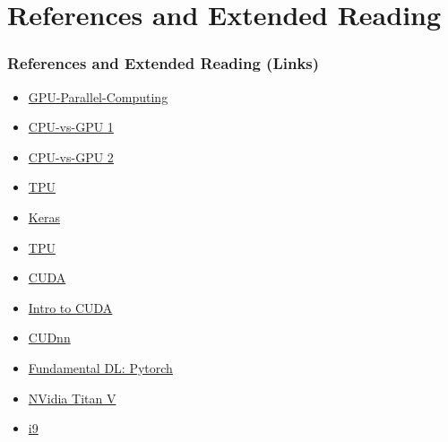 \documentclass[11pt]{beamer}
\begin{document}
\section{References and Extended Reading}
\begin{frame}[fragile]
	\frametitle{References and Extended Reading (Links)}
	
	\begin{itemize}
\item \href{https://openmetal.io/docs/product-guides/private-cloud/gpu-parallel-computing/#GPU-Parallel-Computing}{GPU-Parallel-Computing}
\item \href{https://www.run.ai/guides/multi-gpu/cpu-vs-gpu#hpc}{CPU-vs-GPU 1}
\item \href{https://linuxhint.com/cpu-vs-gpu/#:~:text=While%20a%20CPU%20is%20the,ignited%20a%20worldwide%20AI%20boom.}{CPU-vs-GPU 2}
\item \href{https://cloud.google.com/tpu/docs/tpus}{TPU}
\item \href{https://codelabs.developers.google.com/codelabs/keras-flowers-data/#2}{Keras}
\item \href{https://cloud.google.com/blog/products/ai-machine-learning/an-in-depth-look-at-googles-first-tensor-processing-unit-tpu}{TPU}
\item \href{https://developer.nvidia.com/cuda-zone#:~:text=CUDA%C2%AE%20is%20a%20parallel,harnessing%20the%20power%20of%20GPUs.}{CUDA}
\item \href{https://developer.nvidia.com/blog/even-easier-introduction-cuda/}{Intro to CUDA}
\item \href{https://www.run.ai/guides/nvidia-cuda-basics-and-best-practices/nvidia-cudnn}{CUDnn}
\item \href{https://phucnsp.github.io/blog/self-taught/2020/03/22/self-taught-pytorch-part1-tensor.html}{Fundamental DL: Pytorch}
\item \href{https://www.gpuzoo.com/Compare/NVIDIA_Tesla_V100_SMX2__vs__NVIDIA_Titan_V/}{NVidia Titan V}
\item \href{https://www.intel.com/content/www/us/en/developer/articles/news/raw-compute-power-of-new-intel-core-i9-processor-based-systems-enables-extreme-megatasking.html#:~:text=The%20new%20Intel%C2%AE%20Core,should%20calculate%20to%201.3%20teraflops.}{i9}
	\end{itemize}
	
\end{frame}
\end{document}
